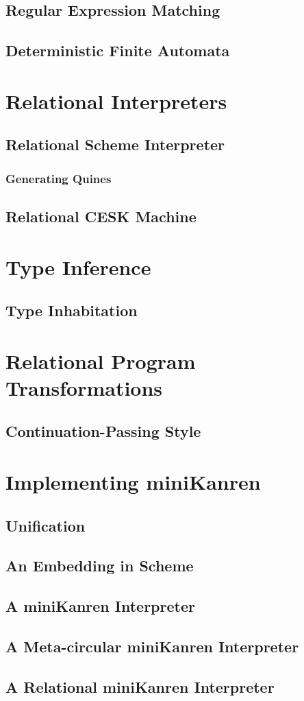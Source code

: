 \documentclass[11pt]{book}
\begin{document}
\begin{schemeregion}
\section{Regular Expression Matching}
\section{Deterministic Finite Automata}

\chapter{Relational Interpreters}
\section{Relational Scheme Interpreter}
\subsection{Generating Quines}
\section{Relational CESK Machine}

\chapter{Type Inference}
\section{Type Inhabitation}

\chapter{Relational Program Transformations}
\section{Continuation-Passing Style}

\chapter{Implementing miniKanren}
\section{Unification}
\section{An Embedding in Scheme}
\section{A miniKanren Interpreter}
\section{A Meta-circular miniKanren Interpreter}
\section{A Relational miniKanren Interpreter}


\end{schemeregion}
\end{document}

